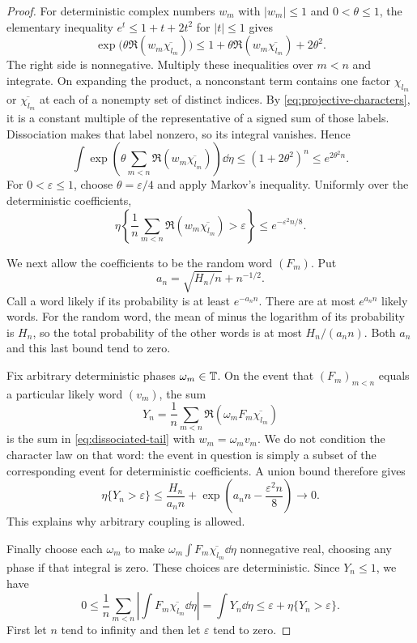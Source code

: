 \begin{proof}
For deterministic complex numbers $w_m$ with $|w_m|\le1$ and
$0<\theta\le1$, the elementary inequality
$e^t\le1+t+2t^2$ for $|t|\le1$ gives
\[
 \exp\bigl(\theta\Re(w_m\overline{\chi_{l_m}})\bigr)
 \le 1+\theta\Re(w_m\overline{\chi_{l_m}})+2\theta^2.
\]
The right side is nonnegative. Multiply these inequalities over $m<n$ and
integrate. On expanding the product, a nonconstant term contains one factor
$\chi_{l_m}$ or $\overline{\chi_{l_m}}$ at each of a nonempty set of
distinct indices. By \eqref{eq:projective-characters}, it is a constant
multiple of the representative of a signed sum of those labels.
Dissociation makes that label nonzero, so its integral vanishes. Hence
\begin{equation}
 \label{eq:dissociated-exponential}
 \int\exp\left(\theta\sum_{m<n}
       \Re(w_m\overline{\chi_{l_m}})\right)\dd\eta
 \le(1+2\theta^2)^n\le e^{2\theta^2 n}.
\end{equation}
For $0<\varepsilon\le1$, choose $\theta=\varepsilon/4$ and apply
Markov's inequality. Uniformly over the deterministic coefficients,
\begin{equation}
 \label{eq:dissociated-tail}
 \eta\left\{\frac1n\sum_{m<n}
       \Re(w_m\overline{\chi_{l_m}})>\varepsilon\right\}
 \le e^{-\varepsilon^2 n/8}.
\end{equation}

We next allow the coefficients to be the random word $(F_m)$. Put
\[
 a_n=\sqrt{H_n/n}+n^{-1/2}.
\]
Call a word likely if its probability is at least $e^{-a_n n}$. There are
at most $e^{a_n n}$ likely words. For the random word, the mean of minus
the logarithm of its probability is $H_n$, so the total probability of
the other words is at most $H_n/(a_n n)$.
Both $a_n$ and this last bound tend to zero.

Fix arbitrary deterministic phases $\omega_m\in\mathbb T$. On the event that
$(F_m)_{m<n}$ equals a particular likely word $(v_m)$, the sum
\[
 Y_n=\frac1n\sum_{m<n}
       \Re(\omega_m F_m\overline{\chi_{l_m}})
\]
is the sum in \eqref{eq:dissociated-tail} with $w_m=\omega_m v_m$.
We do not condition the character law on that word: the event in question
is simply a subset of the corresponding event for deterministic
coefficients. A union bound therefore gives
\begin{equation}
 \label{eq:likely-word-bound}
 \eta\{Y_n>\varepsilon\}
 \le \frac{H_n}{a_n n}
       +\exp\left(a_n n-\frac{\varepsilon^2 n}{8}\right)
 \longrightarrow0.
\end{equation}
This explains why arbitrary coupling is allowed.

Finally choose each $\omega_m$ to make
$\omega_m\int F_m\overline{\chi_{l_m}}\dd\eta$ nonnegative real,
choosing any phase if that integral is zero. These choices are
deterministic. Since $Y_n\le1$, we have
\[
 0\le\frac1n\sum_{m<n}
       \left|\int F_m\overline{\chi_{l_m}}\dd\eta\right|
   =\int Y_n\dd\eta
   \le\varepsilon+\eta\{Y_n>\varepsilon\}.
\]
First let $n$ tend to infinity and then let $\varepsilon$ tend to zero.
\end{proof}

